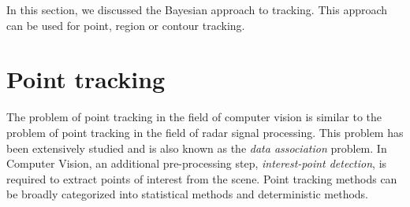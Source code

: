   
%
%
%
%
%
%
%
%




In this section, we discussed the Bayesian approach to tracking.  This approach can be used for point, region or contour tracking.



\section{Point tracking}
The problem of point tracking in the field of computer vision is similar to the problem of point tracking in the field of radar signal processing.  This problem has been extensively studied and is also known as the \emph{data association} problem.  In Computer Vision, an additional pre-processing step, \emph{interest-point detection}, is required to extract points of interest from the scene.  Point tracking methods can be broadly categorized into statistical methods and deterministic methods.

